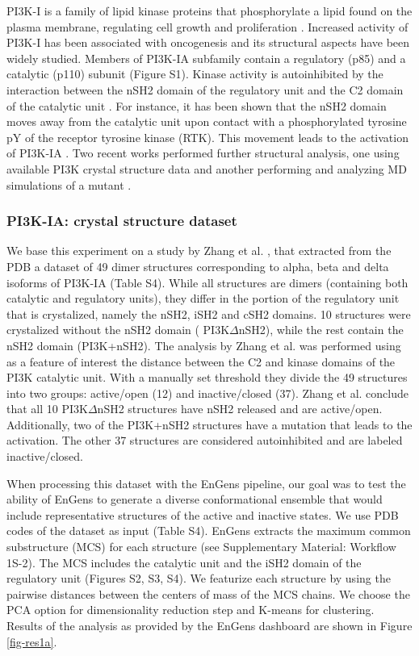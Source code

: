 \documentclass[unnumsec,webpdf,contemporary,large,numsquare]{oup-authoring-template}%
\theoremstyle{thmstyleone}%
\theoremstyle{thmstyletwo}%
\theoremstyle{thmstylethree}%
\begin{document}
PI3K-I is a family of lipid kinase proteins that phosphorylate a lipid found on the plasma membrane, regulating cell growth and proliferation \citep{martini_pi3kakt_2014}. Increased activity of PI3K-I has been associated with oncogenesis and its structural aspects have been widely studied. Members of PI3K-IA subfamily contain a regulatory (p85) and a catalytic (p110) subunit (Figure S1). Kinase activity is autoinhibited by the interaction between the nSH2 domain of the regulatory unit and the C2 domain of the catalytic unit \citep{yu_regulation_1998, miller_structural_2014}. For instance, it has been shown that the nSH2 domain moves away from the catalytic unit upon contact with a phosphorylated tyrosine pY of the receptor tyrosine kinase (RTK). This movement leads to the activation of PI3K-IA \citep{buckles_single-molecule_2017, nolte_crystal_1996, vadas_structural_2011}. Two recent works performed further structural analysis, one using available PI3K crystal structure data \citep{zhang_structural_2020}  and another performing and analyzing MD simulations of a mutant \citep{galdadas_unravelling_2020}. 


\subsubsection{PI3K-IA: crystal structure dataset}

We base this experiment on a study by Zhang et al. \citep{zhang_structural_2020}, that extracted from the PDB a dataset of 49 dimer structures corresponding to alpha, beta and delta isoforms of PI3K-IA (Table S4). While all structures are dimers (containing both catalytic and regulatory units), they differ in the portion of the regulatory unit that is crystalized, namely the nSH2, iSH2 and cSH2 domains. 10 structures were crystalized without the nSH2 domain ( PI3K$\Delta$nSH2), while the rest contain the nSH2 domain (PI3K+nSH2). The analysis by Zhang et al. was performed using as a feature of interest the distance between the C2 and kinase domains of the PI3K catalytic unit. With a manually set threshold they divide the 49 structures into two groups: active/open (12) and inactive/closed (37). Zhang et al. conclude that all 10 PI3K$\Delta$nSH2 structures have nSH2 released and are active/open. Additionally, two of the PI3K+nSH2 structures have a mutation that leads to the activation. The other 37 structures are considered autoinhibited and are labeled inactive/closed.

When processing this dataset with the EnGens pipeline, our goal was to test the ability of EnGens to generate a diverse conformational ensemble that would include representative structures of the active and inactive states. We use PDB codes of the dataset as input (Table S4). EnGens extracts the maximum common substructure (MCS) for each structure (see Supplementary Material: Workflow 1S-2). The MCS includes the catalytic unit and the iSH2 domain of the regulatory unit (Figures S2, S3, S4). We featurize each structure by using the pairwise distances between the centers of mass of the MCS chains. We choose the PCA option for dimensionality reduction step and K-means for clustering. Results of the analysis as provided by the EnGens dashboard are shown in Figure \ref{fig-res1a}. 
\end{document}
